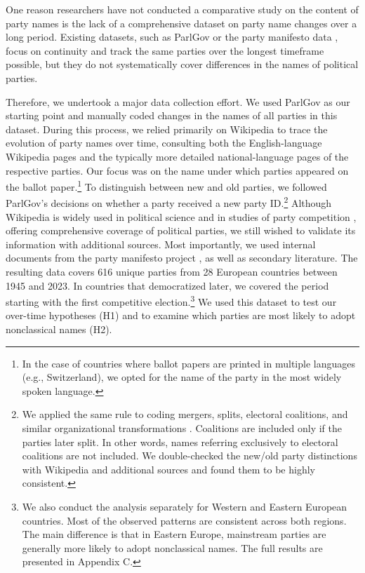 \documentclass[12pt]{article}
\begin{document}
One reason researchers have not conducted a comparative study on the content of party names is the lack of a comprehensive dataset on party name changes over a long period. Existing datasets, such as ParlGov \citep{Doring_Manow_2021} or the party manifesto data \citep{Lehmann_et_al_2023}, focus on continuity and track the same parties over the longest timeframe possible, but they do not systematically cover differences in the names of political parties.

Therefore, we undertook a major data collection effort. We used ParlGov as our starting point and manually coded changes in the names of all parties in this dataset. During this process, we relied primarily on Wikipedia to trace the evolution of party names over time, consulting both the English-language Wikipedia pages and the typically more detailed national-language pages of the respective parties. Our focus was on the name under which parties appeared on the ballot paper.\footnote{In the case of countries where ballot papers are printed in multiple languages (e.g., Switzerland), we opted for the name of the party in the most widely spoken language.} To distinguish between new and old parties, we followed ParlGov's decisions on whether a party received a new party ID.\footnote{We applied the same rule to coding mergers, splits, electoral coalitions, and similar organizational transformations \citep{Ibenskas_Sikk_2017}. Coalitions are included only if the parties later split. In other words, names referring exclusively to electoral coalitions are not included. We double-checked the new/old party distinctions with Wikipedia and additional sources and found them to be highly consistent.} Although Wikipedia is widely used in political science \citep{Brown_2011} and in studies of party competition \citep{Herrmann_Doring_2021}, offering comprehensive coverage of political parties, we still wished to validate its information with additional sources. Most importantly, we used internal documents from the party manifesto project \citep{Lehmann_et_al_2023}, as well as secondary literature. The resulting data covers 616 unique parties from 28 European countries between 1945 and 2023. In countries that democratized later, we covered the period starting with the first competitive election.\footnote{We also conduct the analysis separately for Western and Eastern European countries. Most of the observed patterns are consistent across both regions. The main difference is that in Eastern Europe, mainstream parties are generally more likely to adopt nonclassical names. The full results are presented in Appendix C.} We used this dataset to test our over-time hypotheses (H1) and to examine which parties are most likely to adopt nonclassical names (H2).
\end{document}
